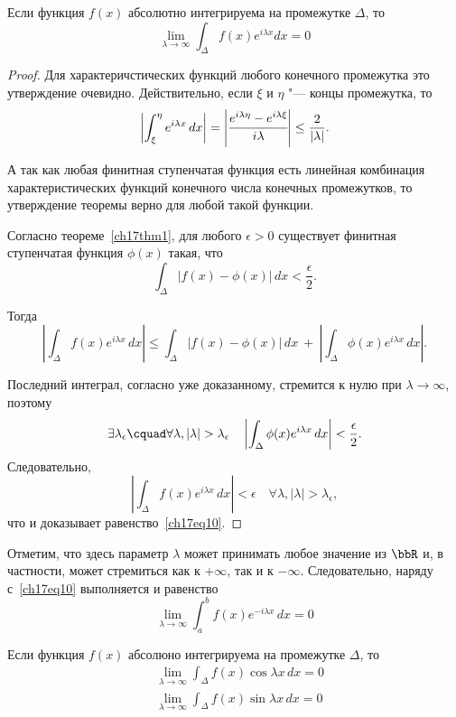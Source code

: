 \begin{thm} \label{ch17thm2}
Если функция $f(x)$ абсолютно интегрируема на промежутке $\Delta$, то
\begin{equation} \label{ch17eq10}
\lim_{\lambda \to \infty}\int_{\Delta} f(x)e^{i\lambda x}dx = 0
\end{equation}
\end{thm}
\begin{proof}
Для характеричстических функций любого конечного промежутка это утверждение очевидно. Действительно, если $\xi$ и $\eta$ "--- концы промежутка, то
$$
\left|\int_{\xi}^{\eta} e^{i\lambda x}\,dx\right| = \left|\cfrac{e^{i\lambda \eta} - e^{i\lambda \xi}}{i\lambda}\right| \le \frac{2}{|\lambda|}.
$$

А так как любая финитная ступенчатая функция есть линейная комбинация характеристических функций конечного числа конечных промежутков, то утверждение теоремы верно для любой такой функции.

Согласно теореме~\ref{ch17thm1}, для любого $\epsilon > 0$ существует финитная ступенчатая функция $\phi(x)$ такая, что
$$
\int_{\Delta} |f(x) - \phi(x)|\,dx < \frac{\epsilon}{2}.
$$

Тогда
$$
\left|\int_{\Delta} f(x)e^{i\lambda x}\,dx\right| \le \int_{\Delta} |f(x) - \phi(x)|\,dx\ +\ \left|\int_{\Delta} \phi(x)e^{i\lambda x}\,dx\right|.
$$

Последний интеграл, согласно уже доказанному, стремится к нулю при $\lambda \to \infty$, поэтому
$$
\exists \lambda_{\epsilon} \cquad \forall \lambda, |\lambda| > \lambda_{\epsilon} \quad \left|\int_{\Delta} \phi(x)e^{i\lambda x}\,dx\right| < \frac{\epsilon}{2}.
$$
Следовательно,
$$
\left|\int_{\Delta} f(x)e^{i\lambda x}\,dx\right| < \epsilon \quad \forall \lambda, |\lambda| > \lambda_{\epsilon},
$$
что и доказывает равенство~\eqref{ch17eq10}.
\end{proof}

Отметим, что здесь параметр $\lambda$ может принимать любое значение из $\bbR$ и, в частности, может стремиться как к $+\infty$, так и к $-\infty$. Следовательно, наряду с~\eqref{ch17eq10} выполняется и равенство
$$
\lim_{\lambda \to \infty}\int_{a}^{b} f(x)e^{-i\lambda x}\,dx = 0
$$

\begin{cons}
Если функция $f(x)$ абсолюно интегрируема на промежутке $\Delta$, то
\begin{align*}
&\lim_{\lambda \to \infty}\int_{\Delta} f(x)\cos{\lambda x}\,dx = 0\\
&\lim_{\lambda \to \infty}\int_{\Delta} f(x)\sin{\lambda x}\,dx = 0
\end{align*}
\end{cons}

